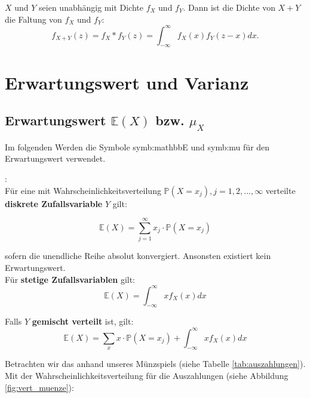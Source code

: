{    \begin{satz}\label{satz:faltung_dichten} $X$ und $Y$ seien unabhängig mit Dichte $f_X$ und $f_Y$.
        Dann ist die Dichte von $X+Y$ die Faltung von $f_X$ und $f_Y$:
        \[f_{X+Y}(z)=f_X*f_Y(z)=\int_{-\infty}^{\infty} f_X(x)f_Y(z-x)dx.\]
    \end{satz}


    \section{Erwartungswert und Varianz}

    \subsection{Erwartungswert $\mathbb E(X)$ bzw. $\mu_{X}$}
    \label{sec:erwartungswert}
    Im folgenden Werden die Symbole \gls{symb:mathbbE} und \gls{symb:mu} für den Erwartungswert verwendet.

    \begin{definition}:\\\label{def:erwartungswert}
        Für eine mit Wahrscheinlichkeitsverteilung ${\mathbb P\left(X=x_{j}\right),j=1,2,...,{\infty}}$ verteilte \textbf{diskrete Zufallsvariable} $Y$ gilt:

        \[\mathbb E\left(X\right)=\sum_{j=1}^{{\infty}}{x_{j}\cdot \mathbb P\left(X=x_{j}\right)}\]

        sofern die unendliche Reihe absolut konvergiert. Ansonsten existiert kein Erwartungswert.\\

        Für \textbf{stetige Zufallsvariablen} gilt:
        \[\mathbb E\left(X\right)=\int_{-{\infty}}^{{\infty}}{xf_{X}\left(x\right)}dx\]

        Falls $Y$ \textbf{gemischt verteilt} ist, gilt:
        \[\mathbb E\left(X\right)=\sum_{x}{x\cdot \mathbb P(X=x_{j})}+\int_{-{\infty}}^{{\infty}}{xf_{X}(x)}dx\]
    \end{definition}

    Betrachten wir das anhand unseres Münzspiels (siehe Tabelle \ref{tab:auszahlungen}).\\

    Mit der Wahrscheinlichkeitsverteilung für die Auszahlungen (siehe Abbildung \ref{fig:vert_muenze}):

}
